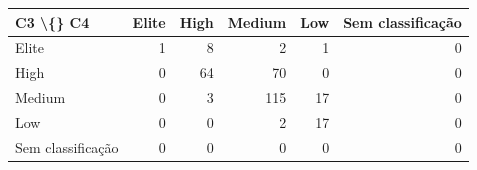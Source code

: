\begin{tabular}{lrrrrr}
\hline
C3 \textbackslash\{\} C4 & Elite & High & Medium & Low & Sem classificação \\
\hline
Elite & 1 & 8 & 2 & 1 & 0 \\
High & 0 & 64 & 70 & 0 & 0 \\
Medium & 0 & 3 & 115 & 17 & 0 \\
Low & 0 & 0 & 2 & 17 & 0 \\
Sem classificação & 0 & 0 & 0 & 0 & 0 \\
\hline
\end{tabular}
